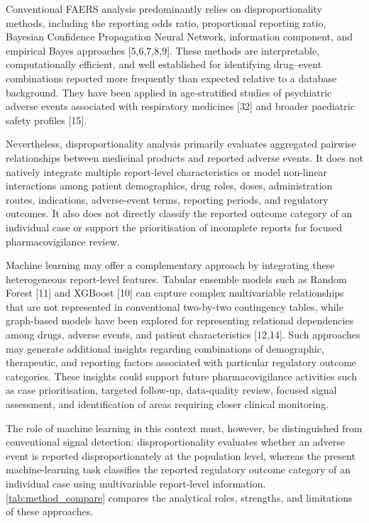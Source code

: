 \documentclass[10pt]{article}
\begin{document}
Conventional FAERS analysis predominantly relies on disproportionality methods, including the reporting odds ratio, proportional reporting ratio, Bayesian Confidence Propagation Neural Network, information component, and empirical Bayes approaches [5,6,7,8,9]. These methods are interpretable, computationally efficient, and well established for identifying drug--event combinations reported more frequently than expected relative to a database background. They have been applied in age-stratified studies of psychiatric adverse events associated with respiratory medicines [32] and broader paediatric safety profiles [15].

Nevertheless, disproportionality analysis primarily evaluates aggregated pairwise relationships between medicinal products and reported adverse events. It does not natively integrate multiple report-level characteristics or model non-linear interactions among patient demographics, drug roles, doses, administration routes, indications, adverse-event terms, reporting periods, and regulatory outcomes. It also does not directly classify the reported outcome category of an individual case or support the prioritisation of incomplete reports for focused pharmacovigilance review.

Machine learning may offer a complementary approach by integrating these heterogeneous report-level features. Tabular ensemble models such as Random Forest [11] and XGBoost [10] can capture complex multivariable relationships that are not represented in conventional two-by-two contingency tables, while graph-based models have been explored for representing relational dependencies among drugs, adverse events, and patient characteristics [12,14]. Such approaches may generate additional insights regarding combinations of demographic, therapeutic, and reporting factors associated with particular regulatory outcome categories. These insights could support future pharmacovigilance activities such as case prioritisation, targeted follow-up, data-quality review, focused signal assessment, and identification of areas requiring closer clinical monitoring.

The role of machine learning in this context must, however, be distinguished from conventional signal detection: disproportionality evaluates whether an adverse event is reported disproportionately at the population level, whereas the present machine-learning task classifies the reported regulatory outcome category of an individual case using multivariable report-level information. \cref{tab:method_compare} compares the analytical roles, strengths, and limitations of these approaches.
\end{document}

